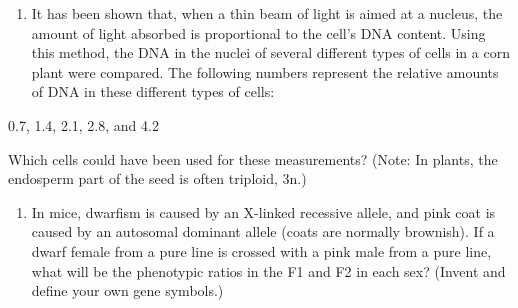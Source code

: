 \documentclass[11pt,]{article}
\providecommand{\tightlist}{%
  \setlength{\itemsep}{0pt}\setlength{\parskip}{0pt}}
\begin{document}
\begin{blackbox}

\begin{enumerate}
\def\labelenumi{\arabic{enumi}.}
\setcounter{enumi}{14}
\tightlist
\item
  It has been shown that, when a thin beam of light is aimed at a
  nucleus, the amount of light absorbed is proportional to the cell's
  DNA content. Using this method, the DNA in the nuclei of several
  different types of cells in a corn plant were compared. The following
  numbers represent the relative amounts of DNA in these different types
  of cells:
\end{enumerate}

\vspace{10mm}

\begin{center}

0.7, 1.4, 2.1, 2.8, and 4.2

\vspace{10mm}
\end{center}

Which cells could have been used for these measurements? (Note: In
plants, the endosperm part of the seed is often triploid, 3n.)

\vspace{14cm}

\end{blackbox}

\begin{blackbox}

\begin{enumerate}
\def\labelenumi{\arabic{enumi}.}
\setcounter{enumi}{19}
\tightlist
\item
  In mice, dwarfism is caused by an X-linked recessive allele, and pink
  coat is caused by an autosomal dominant allele (coats are normally
  brownish). If a dwarf female from a pure line is crossed with a pink
  male from a pure line, what will be the phenotypic ratios in the F1
  and F2 in each sex? (Invent and define your own gene symbols.)
\end{enumerate}

\vspace{19cm}

\end{blackbox}
\end{document}
